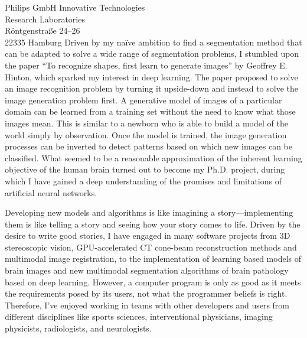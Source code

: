 \documentclass[version=last,
subject=titled,
firsthead=true,
fromalign=center,
fromrule=aftername,
locfield=wide,
firsthead=false,
parskip=half*
]{scrlttr2} %
\begin{document}
\begin{letter}{Philips GmbH Innovative Technologies\\
Research Laboratories\\
R\"ontgenstra\ss e 24--26\\
22335 Hamburg
}
Driven by my na\"ive ambition to find a segmentation method that can be adapted
to solve a wide range of segmentation problems, I stumbled upon the paper ``To
recognize shapes, first learn to generate images'' by Geoffrey E. Hinton, which
sparked my interest in deep learning. The paper proposed to solve an image
recognition problem by turning it upside-down and instead to solve the image
generation problem first. A generative model of images of a particular domain
can be learned from a training set without the need to know what those images
mean. This is similar to a newborn who is able to build a model of the world
simply by observation. Once the model is trained, the image generation processes
can be inverted to detect patterns based on which new images can be classified.
What seemed to be a reasonable approximation of the inherent learning objective
of the human brain turned out to become my Ph.D. project, during which I have
gained a deep understanding of the promises and limitations of artificial neural
networks.

Developing new models and algorithms is like imagining a story---implementing
them is like telling a story and seeing how your story comes to life. Driven by
the desire to write good stories, I have engaged in many software projects from
3D stereoscopic vision, GPU-accelerated CT cone-beam reconstruction methods and
multimodal image registration, to the implementation of learning based models of
brain images and new multimodal segmentation algorithms of brain pathology based
on deep learning. However, a computer program is only as good as it meets the
requirements posed by its users, not what the programmer beliefs is right.
Therefore, I've enjoyed working in teams with other developers and users from
different disciplines like sports sciences, interventional physicians, imaging
physicists, radiologists, and neurologists.




 



\end{letter}
\end{document}
